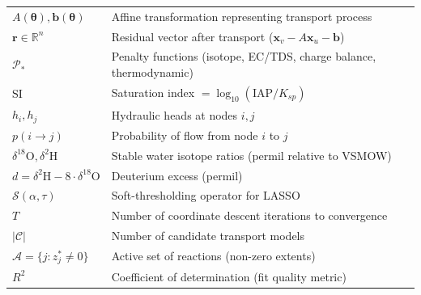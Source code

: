 \documentclass[12pt,a4paper]{article}
\theoremstyle{plain}
\theoremstyle{definition}
\theoremstyle{remark}
\begin{document}
\begin{table}[htbp]
\begin{tabularx}{\textwidth}{@{} l X @{}}
		$A(\boldsymbol{\theta}), \mathbf{b}(\boldsymbol{\theta})$ & Affine transformation representing transport process                                                                         \\
		$\mathbf{r} \in \mathbb{R}^n$                             & Residual vector after transport ($\mathbf{x}_v - A\mathbf{x}_u - \mathbf{b}$)                                                \\
		$\mathcal{P}_*$                                           & Penalty functions (isotope, EC/TDS, charge balance, thermodynamic)                                                           \\
		$\text{SI}$                                               & Saturation index $= \log_{10}(\text{IAP}/K_{sp})$                                                                            \\
		$h_i, h_j$                                                & Hydraulic heads at nodes $i, j$                                                                                              \\
		$p(i \to j)$                                              & Probability of flow from node $i$ to $j$                                                                                     \\
		$\delta^{18}\text{O}, \delta^2\text{H}$                   & Stable water isotope ratios (permil relative to VSMOW)                                                                       \\
		$d = \delta^2\text{H} - 8 \cdot \delta^{18}\text{O}$      & Deuterium excess (permil)                                                                                                    \\
		$\mathcal{S}(\alpha, \tau)$                               & Soft-thresholding operator for LASSO                                                                                         \\
		$T$                                                       & Number of coordinate descent iterations to convergence                                                                       \\
		$|\mathcal{C}|$                                           & Number of candidate transport models                                                                                         \\
		$\mathcal{A} = \{j : z_j^* \neq 0\}$                      & Active set of reactions (non-zero extents)                                                                                   \\
		$R^2$                                                     & Coefficient of determination (fit quality metric)                                                                            \\
		\bottomrule
	\end{tabularx}
\end{table}
\end{document}
